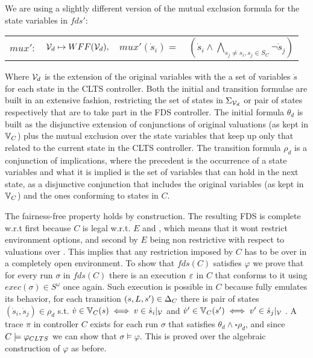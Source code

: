 We are using a slightly different version of the mutual exclusion formula for the state variables in $fds'$:

\begin{center}
	\begin{tabular}{r r r l}
		$mux':$&${\mathcal{V}}_d \mapsto WFF({\mathcal{V}}_d),$&$mux'(\dot{s}_i) = $&$(\dot{s}_i \wedge\bigwedge_{s_j \neq s_i, s_j \in S_C}\neg \dot{s}_j)$
	\end{tabular}
\end{center}

Where ${\mathcal{V}}_d$ is the extension of the original variables with the a set of variables $\dot{s}$ for each state in the CLTS controller. Both the initial and transition formulae are built in an extensive fashion, restricting the set of states in $\Sigma_{{\mathcal{V}}_d}$ or pair of states respectively that are to take part in the FDS controller. The initial formula $\theta_d$ is built as the disjunctive extension of conjunctions of original valuations (as kept in $\mathbb{V}_C$) plus the mutual exclusion over the state variables that keep up only that related to the current state in the CLTS controller. The transition formula $\rho_d$ is a conjunction of implications, where the precedent is the occurrence of a state variables and what it is implied is the set of variables that can hold in the next state, as a disjunctive conjunction that includes the original variables (as kept in $\mathbb{V}_C$) and the ones conforming to states in $C$.

The fairness-free property holds by construction. The resulting FDS is complete w.r.t \gsX first because $C$ is legal w.r.t. $E$ and \controlSet, which means that it wont restrict environment options, and second by $E$ being non restrictive with respect to valuations over \gsV. This implies that any restriction imposed by $C$ has to be over \gsY in a completely open environment.
To show that $fds(C)$ satisfies $\varphi$  we prove that for every run $\sigma$ in $fds(C)$ there is an execution $\varepsilon$ in $C$ that conforms to it using $exec(\sigma) \in S^{\omega}$ once again. Such execution is possible in $C$ because \fdsD fully emulates its behavior, for each transition $(s,L, s')\in \Delta_C$ there is pair of states $(\dot{s}_i,\dot{s}_j) \in \rho_d$ s.t. $\dot{v} \in \mathbb{V}_C(s) \iff v \in \dot{s}_i|_{{\mathcal{V}}}$ and $\dot{v}' \in \mathbb{V}_C(s') \iff v' \in \dot{s}_j|_{{\mathcal{V}}}$ .
A trace $\pi$ in controller $C$ exists for each run $\sigma$ that satisfies $\theta_d \wedge \square \rho_d$, and since $C \models \varphi_{CLTS}$ we can show that $\sigma \models \varphi$. This is proved over the algebraic construction of $\varphi$ as before.
